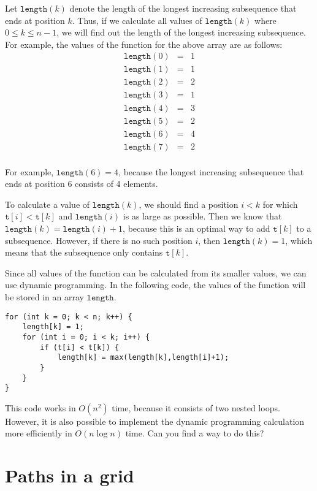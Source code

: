 Let $\texttt{length}(k)$ denote
the length of the
longest increasing subsequence
that ends at position $k$.
Thus, if we calculate all values of
$\texttt{length}(k)$ where $0 \le k \le n-1$,
we will find out the length of the
longest increasing subsequence.
For example, the values of the function
for the above array are as follows:
\[
\begin{array}{lcl}
\texttt{length}(0) & = & 1 \\
\texttt{length}(1) & = & 1 \\
\texttt{length}(2) & = & 2 \\
\texttt{length}(3) & = & 1 \\
\texttt{length}(4) & = & 3 \\
\texttt{length}(5) & = & 2 \\
\texttt{length}(6) & = & 4 \\
\texttt{length}(7) & = & 2 \\
\end{array}
\]

For example, $\texttt{length}(6)=4$,
because the longest increasing subsequence
that ends at position 6 consists of 4 elements.

To calculate a value of $\texttt{length}(k)$,
we should find a position $i<k$
for which $\texttt{t}[i]<\texttt{t}[k]$
and $\texttt{length}(i)$ is as large as possible.
Then we know that
$\texttt{length}(k)=\texttt{length}(i)+1$,
because this is an optimal way to add
$\texttt{t}[k]$ to a subsequence.
However, if there is no such position $i$,
then $\texttt{length}(k)=1$,
which means that the subsequence only contains
$\texttt{t}[k]$.

Since all values of the function can be calculated
from its smaller values,
we can use dynamic programming.
In the following code, the values
of the function will be stored in an array
$\texttt{length}$.

\begin{lstlisting}
for (int k = 0; k < n; k++) {
    length[k] = 1;
    for (int i = 0; i < k; i++) {
        if (t[i] < t[k]) {
            length[k] = max(length[k],length[i]+1);
        }
    }
}
\end{lstlisting}

This code works in $O(n^2)$ time,
because it consists of two nested loops.
However, it is also possible to implement
the dynamic programming calculation
more efficiently in $O(n \log n)$ time.
Can you find a way to do this?

\section{Paths in a grid}

